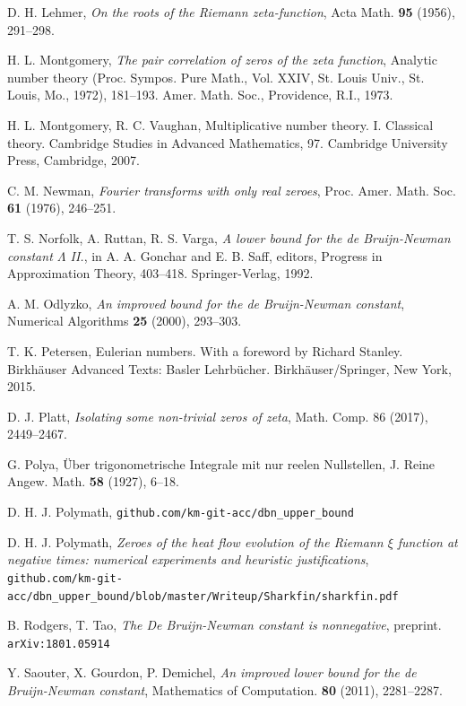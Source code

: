 \documentclass[a4paper,11pt,twoside]{amsart}
\begin{document}
\begin{thebibliography}{99}
D. H. Lehmer, \emph{On the roots of the Riemann zeta-function}, Acta Math. \textbf{95} (1956), 291--298.

H. L. Montgomery, \emph{The pair correlation of zeros of the zeta function}, Analytic number theory (Proc. Sympos. Pure Math., Vol. XXIV, St. Louis Univ., St. Louis, Mo., 1972), 181--193. Amer. Math. Soc., Providence, R.I., 1973.

H. L. Montgomery, R. C. Vaughan, Multiplicative number theory. I. Classical theory. Cambridge Studies in Advanced Mathematics, 97. Cambridge University Press, Cambridge, 2007.

C. M. Newman, \emph{Fourier transforms with only real zeroes}, Proc. Amer. Math. Soc. \textbf{61} (1976), 246--251.

T. S. Norfolk, A. Ruttan, R. S. Varga, \emph{A lower bound for the de Bruijn-Newman
constant $\Lambda$ II.}, in A. A. Gonchar and E. B. Saff, editors, Progress in Approximation
Theory, 403--418. Springer-Verlag, 1992.

A. M. Odlyzko, \emph{An improved bound for the de Bruijn-Newman constant}, Numerical Algorithms \textbf{25} (2000), 293--303.

T. K. Petersen, Eulerian numbers.  With a foreword by Richard Stanley. Birkh\"auser Advanced Texts: Basler Lehrb\"ucher. Birkh\"auser/Springer, New York, 2015.

D. J. Platt, \emph{Isolating some non-trivial zeros of zeta}, Math. Comp. 86 (2017), 2449--2467.

G. Polya, {\"Uber trigonometrische Integrale mit nur reelen Nullstellen}, J. Reine Angew. Math. \textbf{58} (1927), 6--18. 

D. H. J. Polymath, {\tt github.com/km-git-acc/dbn\_upper\_bound}

D. H. J. Polymath, \emph{Zeroes of the heat flow evolution of the Riemann $\xi$ function at negative times: numerical experiments and heuristic justifications}, {\tt github.com/km-git-acc/dbn\_upper\_bound/blob/master/Writeup/Sharkfin/sharkfin.pdf}


B. Rodgers, T. Tao, \emph{The De Bruijn-Newman constant is nonnegative}, preprint. {\tt arXiv:1801.05914}

Y. Saouter, X. Gourdon, P. Demichel, \emph{An improved lower bound for the de Bruijn-Newman constant}, Mathematics of Computation. \textbf{80} (2011), 2281--2287. 


\end{thebibliography}
\end{document}

